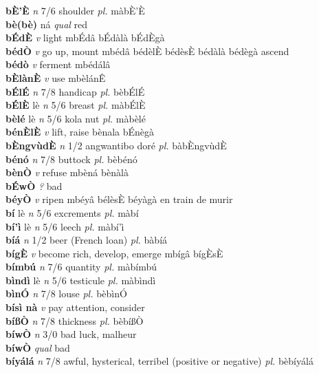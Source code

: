 \documentclass{article}
\begin{document}
{\bf bÈ'È}  {\it n} 7/6 shoulder {\it pl.} màbÈ'È         \\ 
{\bf bè(bè)} ná {\it qual} red         \\ 
{\bf bÉdÈ}  {\it v} light   mbÉdâ   bÉdàlà bÉdÈgà  \\ 
{\bf bédÒ}  {\it v} go up, mount   mbédâ bédèlÈ bédèsÈ bédàlà bédègà ascend  \\ 
{\bf bédò}  {\it v} ferment   mbédálâ      \\ 
{\bf bÈlànÈ}  {\it v} use   mbèlánÊ      \\ 
{\bf bÉlÉ}  {\it n} 7/8 handicap {\it pl.} bèbÉlÉ         \\ 
{\bf bÉlÈ} lè {\it n} 5/6 breast {\it pl.} màbÉlÈ         \\ 
{\bf bèlé} lè {\it n} 5/6 kola nut {\it pl.} màbèlé         \\ 
{\bf bénÈlÈ}  {\it v} lift, raise      bènala bÉnègà  \\ 
{\bf bÈngvùdÈ}  {\it n} 1/2 angwantibo doré {\it pl.} bàbÈngvùdÈ         \\ 
{\bf bénó}  {\it n} 7/8 buttock {\it pl.} bèbénó         \\ 
{\bf bènÒ}  {\it v} refuse   mbèná   bènàlà   \\ 
{\bf bÉwÒ}  {\it ?} bad         \\ 
{\bf béyÒ}  {\it v} ripen   mbéyâ  bélèsÈ  béyàgà en train de murir  \\ 
{\bf bí} lè {\it n} 5/6 excrements {\it pl.} màbí         \\ 
{\bf bí'ì} lè {\it n} 5/6 leech {\it pl.} màbí'ì         \\ 
{\bf bíá}  {\it n} 1/2 beer (French loan) {\it pl.} bàbíá         \\ 
{\bf bígÈ}  {\it v} become rich, develop, emerge   mbígâ  bígÈsÈ    \\ 
{\bf bímbú}  {\it n} 7/6 quantity {\it pl.} màbímbú         \\ 
{\bf bìndì} lè {\it n} 5/6 testicule {\it pl.} màbìndì         \\ 
{\bf bìnÓ}  {\it n} 7/8 louse {\it pl.} bèbìnÓ         \\ 
{\bf bísì nà}  {\it v} pay attention, consider         \\ 
{\bf bíßÒ}  {\it n} 7/8 thickness {\it pl.} bèbíßÒ         \\ 
{\bf bíwÒ}  {\it n} 3/0 bad luck, malheur         \\ 
{\bf bíwÒ}  {\it qual} bad         \\ 
{\bf bíyálá}  {\it n} 7/8 awful, hysterical, terribel (positive or negative) {\it pl.} bèbíyálá         \\ 
\end{document}
